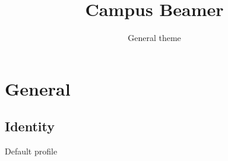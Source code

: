 \documentclass{beamer}
\title{Campus Beamer}
\author{General theme}
\date{}
\begin{document}
\maketitle
\section{General}
\subsection{Identity}
\begin{frame}{Default profile}
  \fitgraphic[width=.4,height=.15]{\schoolwordmarkonlight}
\end{frame}
\backmatter
\end{document}
